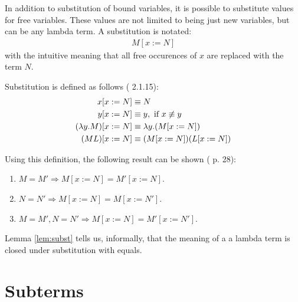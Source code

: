 In addition to substitution of bound variables, it is possible to substitute
values for free variables. These values are not limited to being just new
variables, but can be any lambda term. A substitution is notated:
\begin{align*}
	M[x:=N]
\end{align*}
with the intuitive meaning that all free occurences of $x$ are replaced with 
the term $N$.
\begin{definition}
Substitution is defined as follows (\cite{Barendregt} 2.1.15):
\begin{align*}
	x[x:=N]&\equiv N \\
	y[x:=N]&\equiv y, \text{ if } x \not\equiv y \\
	(\lambda y.M)[x:=N]&\equiv\lambda y.(M[x:=N]) \\
	(M L)[x:=N]&\equiv(M[x:=N])(L[x:=N])
\end{align*}
\end{definition}
Using this definition, the following result can be shown (\cite{Barendregt} p. 28):
\begin{lemma}\label{lem:subst}
	\begin{enumerate}
		\item $M=M'\Rightarrow M[x:=N]=M'[x:=N]$.
		\item $N=N'\Rightarrow M[x:=N]=M[x:=N']$.
		\item $M=M', N=N'\Rightarrow M[x:=N]=M'[x:=N']$.
	\end{enumerate}
\end{lemma}
Lemma \ref{lem:subst} tells us, informally, that the meaning of a a lambda term
is closed under substitution with equals.

\section{Subterms}


